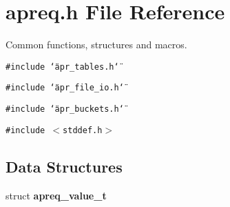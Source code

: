\section{apreq.h File Reference}
\label{apreq_8h}
Common functions, structures and macros. 


{\tt \#include \char`\"{}apr\_\-tables.h\char`\"{}}\par
{\tt \#include \char`\"{}apr\_\-file\_\-io.h\char`\"{}}\par
{\tt \#include \char`\"{}apr\_\-buckets.h\char`\"{}}\par
{\tt \#include $<$stddef.h$>$}\par
\subsection*{Data Structures}
\begin{CompactItemize}
\item 
struct {\bf apreq\_\-value\_\-t}
\end{CompactItemize}
